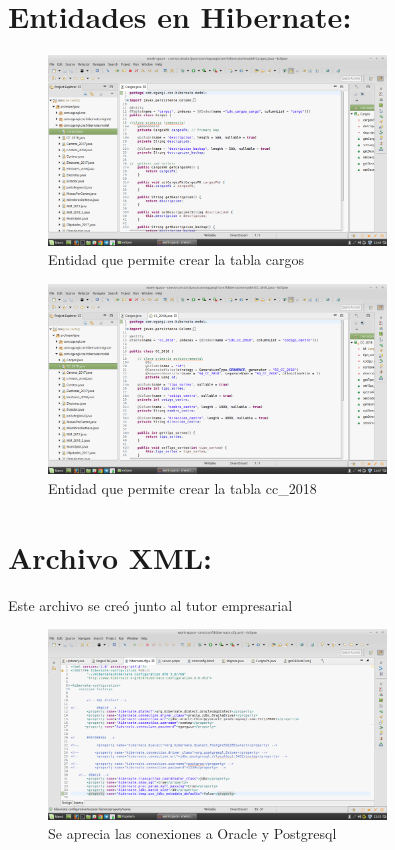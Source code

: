 \documentclass[12pt,oneside]{book}
\begin{document}
	\section{Entidades en Hibernate:}
	
		\begin{figure}[H]
		\centering
		\includegraphics[width=0.8\textwidth]{cargos.png}
		\caption{Entidad que permite crear la tabla cargos}
		\label{k1}
	\end{figure}
	
	\begin{figure}[H]
		\centering
		\includegraphics[width=0.8\textwidth]{cc_2018.png}
		\caption{Entidad que permite crear la tabla cc\_2018}
		\label{j1}
	\end{figure}
	
	\section{Archivo XML:}
	Este archivo se creó junto al tutor empresarial
	
		\begin{figure}[H]
		\centering
		\includegraphics[width=0.8\textwidth]{hibernatexml.png}
		\caption{Se aprecia las conexiones a Oracle y Postgresql}
		\label{g1}
	\end{figure}
	
\end{document}
